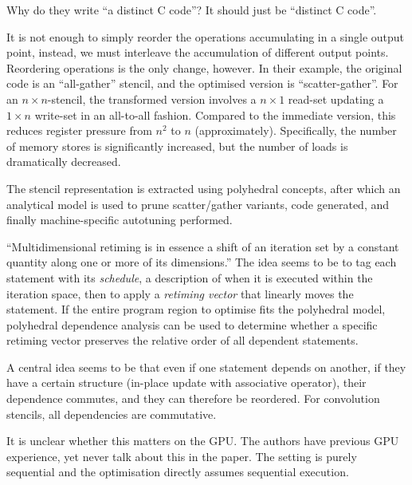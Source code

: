 \documentclass[a4paper, oneside, final]{memoir}
\begin{document}
Why do they write ``a distinct C code''?  It should just be ``distinct
C code''.

It is not enough to simply reorder the operations accumulating in a
single output point, instead, we must interleave the accumulation of
different output points.  Reordering operations is the only change,
however.  In their example, the original code is an ``all-gather''
stencil, and the optimised version is ``scatter-gather''.  For an $n
\times n$-stencil, the transformed version involves a $n \times 1$
read-set updating a $1 \times n$ write-set in an all-to-all fashion.
Compared to the immediate version, this reduces register pressure from
$n^{2}$ to $n$ (approximately).  Specifically, the number of memory
stores is significantly increased, but the number of loads is
dramatically decreased.

The stencil representation is extracted using polyhedral concepts,
after which an analytical model is used to prune scatter/gather
variants, code generated, and finally machine-specific autotuning
performed.

``Multidimensional retiming is in essence a shift of an iteration set
by a constant quantity along one or more of its dimensions.''  The
idea seems to be to tag each statement with its \textit{schedule}, a
description of when it is executed within the iteration space, then to
apply a \textit{retiming vector} that linearly moves the statement.
If the entire program region to optimise fits the polyhedral model,
polyhedral dependence analysis can be used to determine whether a
specific retiming vector preserves the relative order of all dependent
statements.

A central idea seems to be that even if one statement depends on
another, if they have a certain structure (in-place update with
associative operator), their dependence commutes, and they can
therefore be reordered.  For convolution stencils, all dependencies
are commutative.

It is unclear whether this matters on the GPU.  The authors have
previous GPU experience, yet never talk about this in the paper.  The
setting is purely sequential and the optimisation directly assumes
sequential execution.
\end{document}
